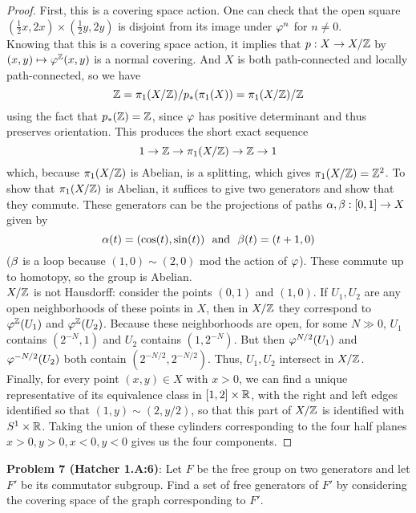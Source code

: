 \documentclass{amsart}
\begin{document}
\begin{proof}
	First, this is a covering space action. One can check that the open square $(\tfrac12 x,2x)\times (\tfrac12 y,2y)$ is disjoint from its image under $\varphi^n$ for $n\neq 0$.\\
	
	Knowing that this is a covering space action, it implies that $p:X\to X/\mathbb{Z}$ by $(x,y)\mapsto \varphi^{\mathbb{Z}}(x,y)$ is a normal covering. And $X$ is both path-connected and locally path-connected, so we have
	$$
	\mathbb{Z}= \pi_1(X/\mathbb{Z})/p_{*}(\pi_1(X)) = \pi_1(X/\mathbb{Z})/\mathbb{Z}
	$$
	using the fact that $p_*(\mathbb{Z})=\mathbb{Z}$, since $\varphi$ has positive determinant and thus preserves orientation.
	This produces the short exact sequence
	$$
	1 \to \mathbb{Z} \to \pi_1(X/\mathbb{Z}) \to \mathbb{Z}\to 1
	$$
	which, because $\pi_1(X/\mathbb{Z})$ is Abelian, is a splitting, which gives $\pi_1(X/\mathbb{Z}) = \mathbb{Z}^2$. To show that $\pi_1(X/\mathbb{Z})$ is Abelian, it suffices to give two generators and show that they commute. These generators can be the projections of paths $\alpha,\beta:[0,1]\to X$ given by 
	$$\alpha(t) = (\cos(t),\sin(t)) \,\, \text{ and } \,\, \beta(t) = (t+1,0)$$
	($\beta$ is a loop because $(1,0)\sim (2,0)$ mod the action of $\varphi$). These commute up to homotopy, so the group is Abelian.\\
	
	$X/\mathbb{Z}$ is not Hausdorff: consider the points $(0,1)$ and $(1,0)$. If $U_1,U_2$ are any open neighborhoods of these points in $X$, then in $X/\mathbb{Z}$ they correspond to $\varphi^{\mathbb{Z}}(U_1)$ and $\varphi^{\mathbb{Z}}(U_2)$. Because these neighborhoods are open, for some $N\gg 0$, $U_1$ contains $(2^{-N},1)$ and $U_2$ contains $(1,2^{-N})$. But then $\varphi^{N/2}(U_1)$ and $\varphi^{-N/2}(U_2)$ both contain $(2^{-N/2},2^{-N/2})$. Thus, $U_1,U_2$ intersect in $X/\mathbb{Z}$.\\
	
	Finally, for every point $(x,y)\in X$ with $x>0$, we can find a unique representative of its equivalence class in $[1,2]\times \mathbb{R}$, with the right and left edges identified so that $(1,y)\sim (2,y/2)$, so that this part of $X/\mathbb{Z}$ is identified with $S^1\times \mathbb{R}$. Taking the union of these cylinders corresponding to the four half planes $x>0,y>0,x<0,y<0$ gives us the four components.
	
\end{proof}

\newpage 
\noindent \textbf{Problem 7 (Hatcher 1.A:6)}: Let $F$ be the free group on two generators and let $F'$ be its commutator subgroup. Find a set of free generators of $F'$ by considering the covering space of the graph corresponding to $F'$.
\end{document}

